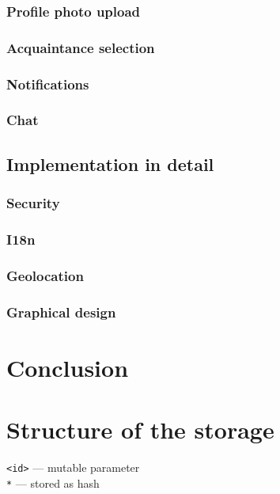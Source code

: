 \documentclass[12pt,oneside]{fithesis}
\begin{document}
		
	\subsection{Profile photo upload}
	\subsection{Acquaintance selection}
	\subsection{Notifications}
	\subsection{Chat}
\section{Implementation in detail}
	\subsection{Security}
	\subsection{I18n}
	\subsection{Geolocation}
	\subsection{Graphical design}
\chapter{Conclusion}

\appendix
\chapter{Structure of the storage}
\label{appendix:scheme}
\texttt{<id>} --- mutable parameter\\
\texttt{*} --- stored as hash
\inputminted[fontsize=\footnotesize]{yaml}{scheme.txt}


\end{document}
